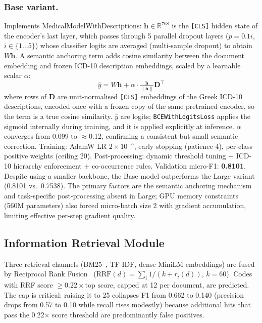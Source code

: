 \subsubsection{Base variant.}
Implements MedicalModelWithDescriptions: $\mathbf{h}\in\mathbb{R}^{768}$ is the
\texttt{[CLS]} hidden state of the encoder's last layer, which passes through 5
parallel dropout layers ($p=0.1i$, $i\in\{1\ldots5\}$) whose classifier logits
are averaged (multi-sample dropout) to obtain $W\mathbf{h}$. A semantic anchoring term adds
cosine similarity between the document embedding and frozen ICD-10 description
embeddings, scaled by a learnable scalar $\alpha$:
\begin{equation}
\hat{y} = W\mathbf{h} + \alpha\cdot\tfrac{\mathbf{h}}{\|\mathbf{h}\|}\mathbf{D}^\top
\end{equation}
where rows of $\mathbf{D}$ are unit-normalised \texttt{[CLS]} embeddings of the Greek
ICD-10 descriptions, encoded once with a frozen copy of the same pretrained encoder,
so the term is a true cosine similarity. $\hat{y}$ are logits; \texttt{BCEWithLogitsLoss}
applies the sigmoid internally during training, and it is applied explicitly at
inference.
$\alpha$ converges from 0.099 to $\approx$0.12, confirming a consistent but small
semantic correction. Training: AdamW LR $2\times10^{-5}$, early stopping (patience 4),
per-class positive weights (ceiling 20). Post-processing: dynamic threshold tuning +
ICD-10 hierarchy enforcement + co-occurrence rules. Validation micro-F1: \textbf{0.8101}.
Despite using a smaller backbone, the Base model outperforms the Large variant
(0.8101 vs.\ 0.7538). The primary factors are the semantic anchoring mechanism and
task-specific post-processing absent in Large; GPU memory constraints (560M parameters)
also forced micro-batch size 2 with gradient accumulation, limiting effective per-step
gradient quality.

\subsection{Information Retrieval Module}
\label{subsec:ir}

Three retrieval channels (BM25~\cite{robertson2009bm25}, TF-IDF, dense MiniLM embeddings) are fused by Reciprocal Rank Fusion~\cite{cormack2009reciprocal} ($\text{RRF}(d)=\sum_i 1/(k+r_i(d))$, $k=60$).
Codes with RRF score $\geq0.22\times\text{top score}$, capped at 12 per document, are predicted. The cap is critical: raising it to 25 collapses F1 from 0.662 to 0.140 (precision drops from 0.57 to 0.10 while recall rises modestly) because additional hits that pass the 0.22$\times$ score threshold are predominantly false positives.

